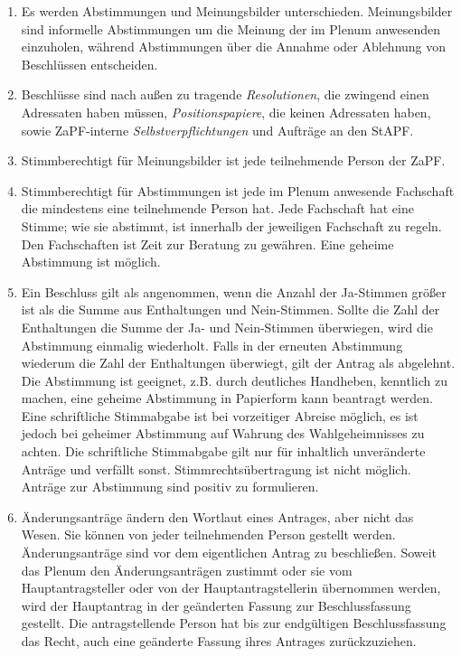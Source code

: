 \documentclass[12pt,oneside]{scrartcl}
\begin{document}
\begin{enumerate}
\item Es werden Abstimmungen und Meinungsbilder unterschieden. Meinungsbilder
sind informelle Abstimmungen um die Meinung der im Plenum anwesenden
einzuholen, während Abstimmungen über die Annahme oder Ablehnung von
Beschlüssen entscheiden.

\item Beschlüsse sind nach außen zu tragende \emph{Resolutionen}, die zwingend einen
Adressaten haben müssen, \emph{Positionspapiere}, die keinen Adressaten haben,
sowie ZaPF-interne \emph{Selbstverpflichtungen} und Aufträge an den StAPF.

\item Stimmberechtigt für Meinungsbilder ist jede teilnehmende Person der ZaPF.

\item Stimmberechtigt für Abstimmungen ist jede im Plenum anwesende Fachschaft
die mindestens eine teilnehmende Person hat.
Jede Fachschaft hat eine Stimme; wie sie abstimmt, ist innerhalb der
jeweiligen Fachschaft zu regeln.
Den Fachschaften ist Zeit zur Beratung zu gewähren.
Eine geheime Abstimmung ist möglich.

\item Ein Beschluss gilt als angenommen, wenn die Anzahl der Ja-Stimmen größer
ist als die Summe aus Enthaltungen und Nein-Stimmen.
Sollte die Zahl der Enthaltungen die Summe der Ja- und Nein-Stimmen
überwiegen, wird die Abstimmung einmalig wiederholt.
Falls in der erneuten Abstimmung wiederum die Zahl der Enthaltungen
überwiegt, gilt der Antrag als abgelehnt.
Die Abstimmung ist geeignet, z.B. durch deutliches Handheben, kenntlich zu
machen, eine geheime Abstimmung in Papierform kann beantragt werden.
Eine schriftliche Stimmabgabe ist bei vorzeitiger Abreise möglich, es ist
jedoch bei geheimer Abstimmung auf Wahrung des Wahlgeheimnisses zu achten.
Die schriftliche Stimmabgabe gilt nur für inhaltlich unveränderte Anträge
und verfällt sonst.
Stimmrechtsübertragung ist nicht möglich.
Anträge zur Abstimmung sind positiv zu formulieren.

\item Änderungsanträge ändern den Wortlaut eines Antrages, aber nicht das Wesen.
Sie können von jeder teilnehmenden Person gestellt werden.
Änderungsanträge sind vor dem eigentlichen Antrag zu beschließen.
Soweit das Plenum den Änderungsanträgen zustimmt oder sie vom
Hauptantragsteller oder von der Hauptantragstellerin übernommen werden,
wird der Hauptantrag in der geänderten Fassung zur Beschlussfassung gestellt.
Die antragstellende Person hat bis zur endgültigen Beschlussfassung das Recht,
auch eine geänderte Fassung ihres Antrages zurückzuziehen.


\end{enumerate}
\end{document}
